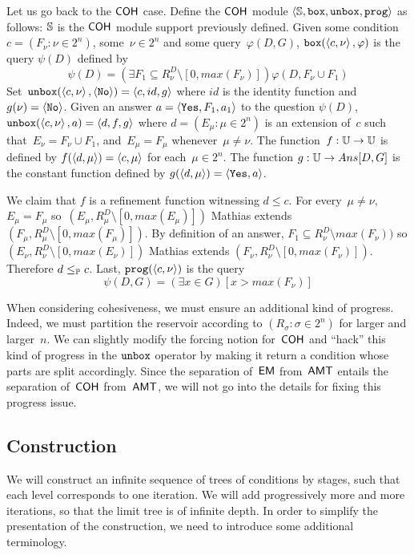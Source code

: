 Let us go back to the $\operatorname{\sf{COH}}$ case.
Define the $\operatorname{\sf{COH}}$ module $\left\langle \mathbb{S}, \mathtt{box}, \mathtt{unbox}, \mathtt{prog} \right\rangle$ as follows:
$\mathbb{S}$ is the $\operatorname{\sf{COH}}$ module support previously defined.
Given some condition~$c = (F_\nu : \nu \in 2^n)$, some~$\nu \in 2^n$ and some query~$\varphi(D, G)$,
$\mathtt{box}(\left\langle c, \nu \right\rangle, \varphi)$ is the query $\psi(D)$ defined by
\[
\psi(D) = (\exists F_1 \subseteq R^D_\nu 
\setminus [0, max(F_\nu)])\varphi(D, F_\nu \cup F_1)
\]
Set~$\mathtt{unbox}(\left\langle c,\nu \right\rangle, \left\langle \mathtt{No} \right\rangle) = \left\langle c, id, g \right\rangle$
where $id$ is the identity function and $g(\nu) = \left\langle \mathtt{No} \right\rangle$.
Given an answer $a = \left\langle \mathtt{Yes}, F_1, a_1 \right\rangle$ to the question $\psi(D)$,
$\mathtt{unbox}(\left\langle c,\nu \right\rangle, a) = \left\langle d, f, g \right\rangle$ where $d = (E_\mu : \mu \in 2^n)$
is an extension of~$c$ such that~$E_\nu = F_\nu \cup F_1$, and~$E_\mu = F_\mu$ whenever~$\mu \neq \nu$.
The function~$f : \mathbb{U} \to \mathbb{U}$ is defined by $f(\left\langle d,\mu \right\rangle) = \left\langle c,\mu \right\rangle$ for each~$\mu \in 2^n$.
The function $g : \mathbb{U} \to \mathop{Ans}[D,G]$ is the constant function defined by $g(\left\langle d,\mu \right\rangle) = \left\langle \mathtt{Yes}, a \right\rangle$.

We claim that $f$ is a refinement function witnessing $d \leq c$. For every~$\mu \neq \nu$,
$E_\mu = F_\mu$ so~$(E_\mu, R^D_\mu \setminus [0, max(E_\mu)])$ 
Mathias extends $(F_\mu, R^D_\mu \setminus [0, max(F_\mu)])$.
By definition of an answer, $F_1 \subseteq R^D_\nu \setminus max(F_\nu))$
so $(E_\nu, R^D_\nu \setminus [0, max(E_\nu)])$ Mathias extends $(F_\nu, R^D_\nu \setminus [0, max(F_\nu)])$.
Therefore $d \leq_{\mathbb{P}} c$.
Last, $\mathtt{prog}(\left\langle c,\nu \right\rangle)$ is the query
\[
\psi(D, G) = (\exists x \in G)[x > max(F_\nu)]
\]

When considering cohesiveness, we must ensure an additional kind of progress. Indeed, we must
partition the reservoir according to $(R_\sigma : \sigma \in 2^n)$
for larger and larger~$n$. We can slightly modify the forcing notion for~$\operatorname{\sf{COH}}$
and ``hack'' this kind of progress in the $\mathtt{unbox}$
operator by making it return a condition whose parts are split accordingly.
Since the separation of~$\operatorname{\sf{EM}}$ from~$\operatorname{\sf{AMT}}$ entails the separation of~$\operatorname{\sf{COH}}$ from~$\operatorname{\sf{AMT}}$,
we will not go into the details for fixing this progress issue.

\subsection{Construction}\label{subsect:framework-construction}

We will construct an infinite sequence of trees of conditions by stages, such that each level
corresponds to one iteration. We will add progressively more and more iterations,
so that the limit tree is of infinite depth.
In order to simplify the presentation of the construction, we need to introduce some additional
terminology.

